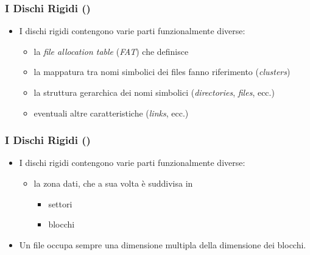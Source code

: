 \setcounter{ms}{1}
\begin{frame}
    \frametitle{I Dischi Rigidi ()}

	\begin{itemize}[<+- | alert@+->]

		\item I dischi rigidi contengono varie parti funzionalmente diverse:

			\vspace{6mm}
			\begin{itemize}[<+- | alert@+->]

				\item la \emph{file allocation table} (\emph{FAT})
                      che definisce

				\item la mappatura tra nomi simbolici dei files
					  fanno riferimento (\emph{clusters})

				\item la struttura gerarchica dei nomi simbolici
                      (\emph{directories}, \emph{files}, ecc.)

				\item eventuali altre caratteristiche
                      (\emph{links}, ecc.)

			\end{itemize}

	\end{itemize}

\end{frame}

\begin{frame}
  \frametitle{I Dischi Rigidi ()}

	\begin{itemize}[<+- | alert@+->]

		\item I dischi rigidi contengono varie parti funzionalmente diverse:

			\vspace{6mm}
			\begin{itemize}[<+- | alert@+->]

				\item la zona dati, che a sua volta \`e suddivisa in

					\begin{itemize}

						\item settori

						\item blocchi

					\end{itemize}

			\end{itemize}

		\item Un file occupa sempre una dimensione multipla
		      della dimensione dei blocchi.

	\end{itemize}

\end{frame}

